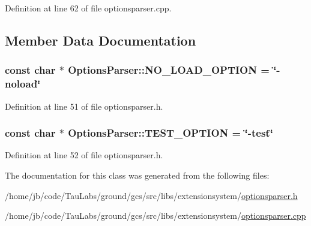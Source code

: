 \-Definition at line 62 of file optionsparser.\-cpp.



\subsection{\-Member \-Data \-Documentation}
\hypertarget{class_extension_system_1_1_internal_1_1_options_parser_a4750d20fa380d4217b6247d0953ea975}{
\subsubsection[{\-N\-O\-\_\-\-L\-O\-A\-D\-\_\-\-O\-P\-T\-I\-O\-N}]{\setlength{\rightskip}{0pt plus 5cm}const char $\ast$ {\bf \-Options\-Parser\-::\-N\-O\-\_\-\-L\-O\-A\-D\-\_\-\-O\-P\-T\-I\-O\-N} = \char`\"{}-\/noload\char`\"{}}}\label{class_extension_system_1_1_internal_1_1_options_parser_a4750d20fa380d4217b6247d0953ea975}


\-Definition at line 51 of file optionsparser.\-h.

\hypertarget{class_extension_system_1_1_internal_1_1_options_parser_a0fa18d9e88d365b1a49705ed70e87a90}{
\subsubsection[{\-T\-E\-S\-T\-\_\-\-O\-P\-T\-I\-O\-N}]{\setlength{\rightskip}{0pt plus 5cm}const char $\ast$ {\bf \-Options\-Parser\-::\-T\-E\-S\-T\-\_\-\-O\-P\-T\-I\-O\-N} = \char`\"{}-\/test\char`\"{}}}\label{class_extension_system_1_1_internal_1_1_options_parser_a0fa18d9e88d365b1a49705ed70e87a90}


\-Definition at line 52 of file optionsparser.\-h.



\-The documentation for this class was generated from the following files\-:\begin{DoxyCompactItemize}
\item 
/home/jb/code/\-Tau\-Labs/ground/gcs/src/libs/extensionsystem/\hyperlink{optionsparser_8h}{optionsparser.\-h}\item 
/home/jb/code/\-Tau\-Labs/ground/gcs/src/libs/extensionsystem/\hyperlink{optionsparser_8cpp}{optionsparser.\-cpp}\end{DoxyCompactItemize}
